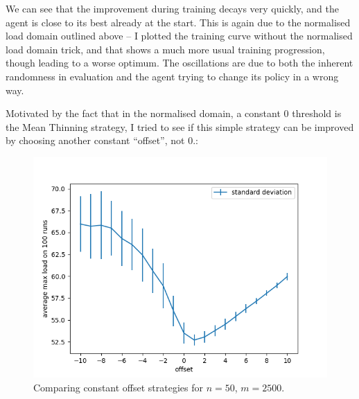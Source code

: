 We can see that the improvement during training decays very quickly, and the agent is close to its best already at the start. This is again due to the normalised load domain outlined above -- I plotted the training curve without the normalised load domain trick, and that shows a much more usual training progression, though leading to a worse optimum. The oscillations are due to both the inherent randomness in evaluation and the agent trying to change its policy in a wrong way.


Motivated by the fact that in the normalised domain, a constant $0$ threshold is the Mean Thinning strategy, I tried to see if this simple strategy can be improved by choosing another constant ``offset'', not $0$.:

\begin{figure}[h] \label{two-thinning-constant-offset}
    \centering
    \includegraphics[scale=0.6]{Chapter4/Figs/offset_analysis_50_2500.png}
    \caption{Comparing constant offset strategies for $n=50$, $m=2500$.}
\end{figure}



